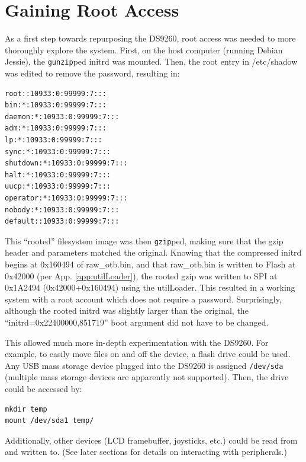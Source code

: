 \documentclass[]{article}
\begin{document}
\section{Gaining Root Access}
\label{sec:root}
\par As a first step towards repurposing the DS9260, root access was needed to more thoroughly explore the system. First, on the host computer (running Debian Jessie), the \texttt{gunzip}ped initrd was mounted. Then, the root entry in /etc/shadow was edited to remove the password, resulting in:
\begin{verbatim}
root::10933:0:99999:7:::
bin:*:10933:0:99999:7:::
daemon:*:10933:0:99999:7:::
adm:*:10933:0:99999:7:::
lp:*:10933:0:99999:7:::
sync:*:10933:0:99999:7:::
shutdown:*:10933:0:99999:7:::
halt:*:10933:0:99999:7:::
uucp:*:10933:0:99999:7:::
operator:*:10933:0:99999:7:::
nobody:*:10933:0:99999:7:::
default::10933:0:99999:7:::
\end{verbatim}
\par This ``rooted'' filesystem image was then \texttt{gzip}ped, making sure that the gzip header and parameters matched the original. Knowing that the compressed initrd begins at 0x160494 of raw\_otb.bin, and that raw\_otb.bin is written to Flash at 0x42000 (per App. \ref{app:utilLoader}), the rooted gzip was written to SPI at 0x1A2494 (0x42000+0x160494) using the utilLoader. This resulted in a working system with a root account which does not require a password. Surprisingly, although the rooted initrd was slightly larger than the original, the ``initrd=0x22400000,851719'' boot argument did not have to be changed. 
\par This allowed much more in-depth experimentation with the DS9260. For example, to easily move files on and off the device, a flash drive could be used. Any USB mass storage device plugged into the DS9260 is assigned \texttt{/dev/sda} (multiple mass storage devices are apparently not supported). Then, the drive could be accessed by:
\begin{verbatim}
mkdir temp
mount /dev/sda1 temp/
\end{verbatim}
Additionally, other devices (LCD framebuffer, joysticks, etc.) could be read from and written to. (See later sections for details on interacting with peripherals.)
\end{document}
